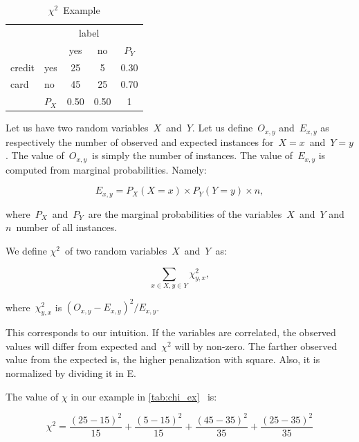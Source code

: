 \begin{table}[h!]
 \center
 \begin{tabular}{|l|l|c|c|c}
 \cline{3-4}
        &       & \multicolumn{2}{c|}{label} & \\
        \cline{3-4}
        &       & yes        & no            & $P_Y$ \\
        \cline{1-4}
 credit & yes   & 25         & 5             & 0.30 \\
        \cline{2-4}
 card   & no    & 45         & 25            & 0.70 \\
        \cline{1-4}
        & $P_X$ & 0.50       & 0.50          & 1
 
 \end{tabular}
 \caption{$\chi^2$~Example}
 \label{tab:chi_ex}
\end{table}

Let us have two random variables~$X$~and~$Y$.
Let us define~$O_{x,y}$ and~$E_{x,y}$
as respectively the number of observed and expected instances for~$X=x$~and~$Y=y$.
The value of~$O_{x,y}$~is simply the number of instances.
The value of~$E_{x,y}$ is computed from marginal probabilities.
Namely:

\begin{equation}
E_{x,y} = P_X(X=x) \times P_Y(Y=y) \times n,
\end{equation}

where~$P_X$~and~$P_Y$~are the marginal probabilities of the variables~$X$~and~$Y$
and~$n$~number of all instances.

We define $\chi^2$~of two random variables~$X$~and~$Y$~as:

$$\sum_{x \in X, y \in Y}{\chi^2_{y,x}},$$

where~${\chi^2_{y,x}}$ is $\left(O_{x,y} - E_{x,y} \right)^ 2 / E_{x,y}$.

This corresponds to our intuition.
If the variables are correlated,
the observed values will differ from expected and~$\chi^2$ will by non-zero.
The farther observed value from the expected is, the higher penalization with square.
Also, it is normalized by dividing it in E.

The value of $\chi$ in our example in \autoref{tab:chi_ex}
~is:

\begin{equation}
\chi^2 = 
\frac{\left(25-15\right)^2}{15} +
\frac{\left(5-15\right)^2}{15} +
\frac{\left(45-35\right)^2}{35} +
\frac{\left(25-35\right)^2}{35}
\end{equation}


